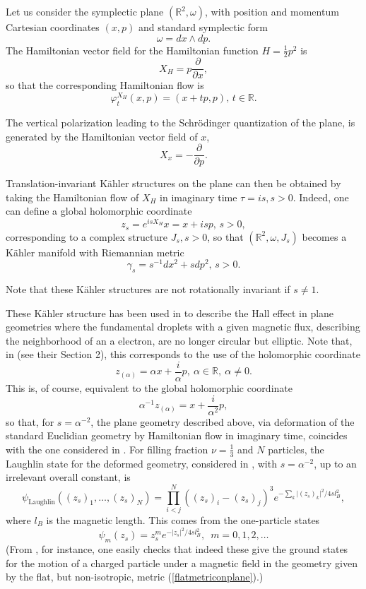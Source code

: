 \documentclass[a4paper,11pt]{article}
\newcommand{\R}{\mathbb{R}}
\begin{document}
\begin{appendices}
Let us consider the symplectic plane $(\R^2,\omega)$, with position and momentum Cartesian coordinates $(x,p)$ and standard symplectic form
$$
\omega = dx \wedge dp.
$$
The Hamiltonian vector field for the Hamiltonian function $H= \frac12 p^2$ is
$$
X_H = p \frac{\partial}{\partial x},
$$
so that the corresponding Hamiltonian flow is 
$$
\varphi^{X_H}_t(x,p) = (x+tp, p),\, t\in \R.
$$

The vertical  polarization leading to the Schr\"odinger quantization of the plane, is generated by the Hamiltonian vector field of $x$,
$$
X_x = -\frac{\partial}{\partial p}.
$$

Translation-invariant K\"ahler structures on the plane can then be obtained by taking the Hamiltonian flow of $X_H$ in imaginary time $\tau = is, s>0$. Indeed, one can define a global holomorphic coordinate
$$
z_s = e^{isX_H} x = x+isp,\, s> 0,
$$
corresponding to a complex structure $J_s, s>0$, so that $(\R^2,\omega, J_s)$ becomes a K\"ahler manifold with Riemannian metric
\begin{equation}\label{flatmetriconplane}
\gamma_s = s^{-1} dx^2 + sdp^2, \, s>0.
\end{equation}


Note that these K\"ahler structures are not rotationally invariant if $s\neq 1.$
 

These K\"ahler structure has been used in \cite{Johri.Papic.Schmitteckert.Bhatt.Haldane2016} to describe the Hall effect in plane geometries where the fundamental droplets with a given magnetic flux, describing the neighborhood of an a electron, are no longer circular but elliptic.
Note that, in \cite{Johri.Papic.Schmitteckert.Bhatt.Haldane2016} (see their Section 2), this corresponds to the use of the holomorphic coordinate 
$$
z_{(\alpha)}=  \alpha x + \frac{i}{\alpha} p,\ \alpha\in \R,\ \alpha\neq 0. 
$$
This is, of course, equivalent to the global holomorphic coordinate
$$
\alpha^{-1} z_{(\alpha)} = x + \frac{i}{\alpha^2} p,
$$
so that, for $s= {\alpha}^{-2}$, the plane geometry described above, via deformation of the standard Euclidian geometry by Hamiltonian flow in imaginary time, coincides with the one considered in \cite{Johri.Papic.Schmitteckert.Bhatt.Haldane2016}.
For filling fraction $\nu = \frac13$ and $N$ particles, the Laughlin state for the deformed geometry, considered in \cite{Johri.Papic.Schmitteckert.Bhatt.Haldane2016}, with $s= \alpha^{-2}$,
up to an irrelevant overall constant, is
\begin{equation}\label{laughlinhaldaneprobing}
\psi_{\mathrm{Laughlin}} ((z_s)_1, \dots, (z_s)_{N}) = 
\prod_{i<j}^N \left((z_s)_{i}-(z_s)_{j}\right)^3 e^{-\sum_{k} \vert (z_s)_{k}\vert^2/ 4sl_B^2},
\end{equation}
where $l_B$ is the magnetic length. This comes from the one-particle states
\begin{equation}\label{eqflatoneparticle}
\psi_m(z_s) = z_s^m e^{-\vert z_s\vert^2/ 4sl_B^2},\,\,\,  m=0,1, 2, \dots     
\end{equation}
(From \cite{Murayama}, for instance, one easily checks that indeed these give the ground states for the motion of a charged particle under a magnetic field in the geometry given by the flat, but non-isotropic, metric (\ref{flatmetriconplane}).)


\end{appendices}
\end{document}

